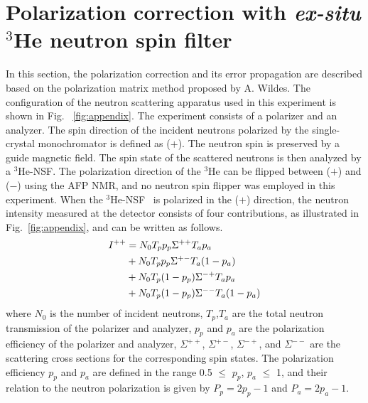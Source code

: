 \documentclass[%
 reprint,
superscriptaddress,
 amsmath,amssymb,
 aps,
]{revtex4-2}
\newcommand{\He}{$^3$He }
\newcommand{\Hensf}{$^3$He-NSF}
\begin{document}
\section{Polarization correction with \textit{ex-situ} \He neutron spin filter}
\label{appendix}
In this section, the polarization correction and its error propagation are described based on the polarization matrix method proposed by A. Wildes.
The configuration of the neutron scattering apparatus used in this experiment is shown in Fig.~ \ref{fig:appendix}.
The experiment consists of a polarizer and an analyzer. The spin direction of the incident neutrons polarized by the  single-crystal monochromator is defined as ($+$).
The neutron spin is preserved by a guide magnetic field. The spin state of the scattered neutrons is then analyzed by a \Hensf.
The polarization direction of the \He can be flipped between ($+$) and ($-$) using the AFP NMR, and no neutron spin flipper was employed in this experiment.
When the \Hensf~ is polarized in the ($+$) direction, the neutron intensity measured at the detector consists of four contributions, as illustrated in Fig.~\ref{fig:appendix}, and can be written as follows.
\begin{align}
    I^{++} &= N_0 T_p p_p \Sigma^{++} T_a p_a \notag \\
    &+ N_0 T_p p_p \Sigma^{+-} T_a (1-p_a) \notag\\
    &+N_0 T_p (1-p_p) \Sigma^{-+} T_a p_a \notag \\
    &+ N_0 T_p (1-p_p) \Sigma^{--} T_a (1-p_a)
    \label{eq:Ipp}
\end{align}
where $N_0$ is the number of incident neutrons,
$T_p$,$T_a$ are the total neutron transmission of the polarizer and analyzer,
$p_p$ and $p_a$ are the polarization efficiency of the polarizer and analyzer,
$\Sigma^{++}$, $\Sigma^{+-}$, $\Sigma^{-+}$, and $\Sigma^{--}$ are the scattering cross sections for the corresponding spin states.
The polarization efficiency $p_p$ and $p_a$ are defined in the range 0.5 $\leq$ $p_p$, $p_a$ $\leq$ 1, and their relation to the neutron polarization is given by $P_p = 2p_p -1$ and $P_a = 2p_a -1$.
\end{document}
